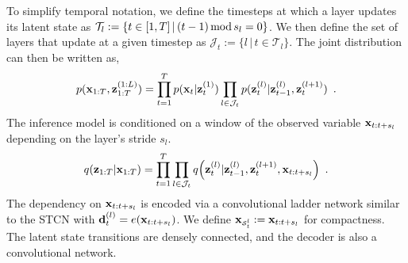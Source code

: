 {To simplify temporal notation, we define the timesteps at which a layer updates its latent state as $\mathcal{T}_l := \{t \in {\left[1,T\right]} \,|\, (t-1)\,\text{mod}\, s_l = 0\}$. We then define the set of layers that update at a given timestep as $\mathcal{J}_t := \{ l \,|\, t\in\mathcal{T}_l \}$. The joint distribution can then be written as,
\begin{equation}
    p(\xb_{1:T},\zb_{1:T}^{(1:L)}) = 
    \prod_{t=1}^{T} p(\xb_t | \zb_t^{(1)})
    \prod\limits_{l\in\mathcal{J}_t} p(\zb_t^{(l)} | \zb_{t-1}^{(l)}, \zb_t^{(l+1)}) \enspace . \nonumber
    \label{eq: cwvae joint}
\end{equation}
The inference model is conditioned on a window of the observed variable ${\mathbf{x}}_{t:t+s_l}$ depending on the layer's stride $s_l$.
\begin{equation}
    q\pa{\zb_{1:T} | \xb_{1:T}} = \prod_{t=1}^T \prod\limits_{l\in\mathcal{J}_t} q\pa{\zb_t^{(l)} | \zb_{t-1}^{(l)}, \zb_t^{(l+1)}, \xb_{t:t+s_l}} \enspace . \nonumber
    \label{eq: cwvae inference}
\end{equation}
The dependency on ${\mathbf{x}}_{t:t+s_l}$ is encoded via a convolutional ladder network similar to the STCN with ${\mathbf{d}}_t^{(l)} = e({\mathbf{x}}_{t:t+s_l})$. We define ${\mathbf{x}}_{\scriptscriptstyle\mathcal{S}_t^l}:={\mathbf{x}}_{t:t+s_l}$ for compactness. The latent state transitions are densely connected, and the decoder is also a convolutional network. 
}
